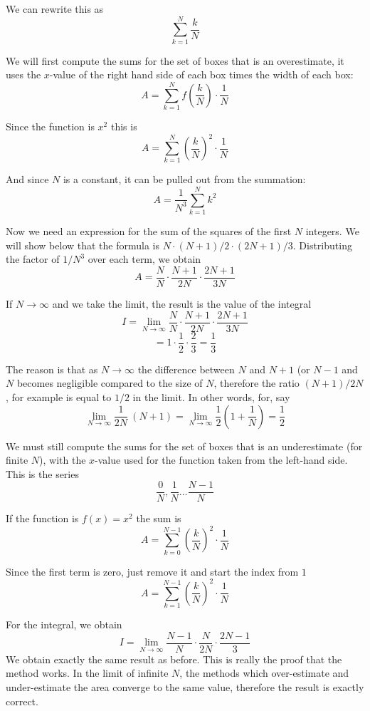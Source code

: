 \documentclass[11pt, oneside]{article}   	%
\begin{document}
We can rewrite this as 
\[ \sum_{k=1}^N \frac{k}{N} \]

We will first compute the sums for the set of boxes that is an overestimate, it uses the $x$-value of the right hand side of each box times the width of each box:
\[ A = \sum_{k=1}^{N} f(\frac{k}{N}) \cdot \frac{1}{N}  \]

Since the function is $x^2$ this is
\[ A = \sum_{k=1}^{N} (\frac{k}{N})^2 \cdot \frac{1}{N}  \]

And since $N$ is a constant, it can be pulled out from the summation:
\[  A = \frac{1}{N^3} \sum_{k=1}^N k^2 \]

Now we need an expression for the sum of the squares of the first $N$ integers.  We will show below that the formula is $N \cdot (N+1)/2 \cdot (2N+1)/3$.  Distributing the factor of $1/N^3$ over each term, we obtain
\[ A = \frac{N}{N} \cdot \frac{N+1}{2N} \cdot \frac{2N+1}{3N} \]

If $N \rightarrow \infty$ and we take the limit, the result is the value of the integral
\[ I = \lim_{N \rightarrow \infty}  \frac{N}{N} \cdot \frac{N+1}{2N} \cdot \frac{2N+1}{3N} \]
\[ = 1 \cdot \frac{1}{2} \cdot \frac{2}{3} = \frac{1}{3}  \]

The reason is that as $N \rightarrow \infty$ the difference between $N$ and $N+1$ (or $N-1$ and $N$ becomes negligible compared to the size of $N$, therefore the ratio $(N+1)/2N$, for example is equal to $1/2$ in the limit.  In other words, for, say
\[ \lim_{N \rightarrow \infty}  \frac{1}{2N} \ (N + 1) = \lim_{N \rightarrow \infty} \frac{1}{2}(1 + \frac{1}{N}) = \frac{1}{2} \]

We must still compute the sums for the set of boxes that is an underestimate (for finite $N$), with the $x$-value used for the function taken from the left-hand side.  This is the series
\[ \frac{0}{N}, \frac{1}{N} \dots \frac{N-1}{N} \]

If the function is $f(x) = x^2$ the sum is
\[ A = \sum_{k=0}^{N-1} (\frac{k}{N})^2 \cdot \frac{1}{N}  \]

Since the first term is zero, just remove it and start the index from $1$
\[ A = \sum_{k=1}^{N-1} (\frac{k}{N})^2 \cdot \frac{1}{N}  \]

For the integral, we obtain
\[ I = \lim_{N \rightarrow \infty}  \frac{N-1}{N} \cdot \frac{N}{2N} \cdot \frac{2N-1}{3} \]
We obtain exactly the same result as before. This is really the proof that the method works.  In the limit of infinite $N$, the methods which over-estimate and under-estimate the area converge to the same value, therefore the result is exactly correct.
\end{document}
